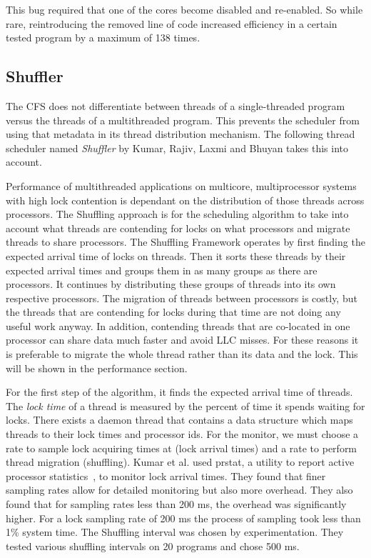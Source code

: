 \documentclass{sig-alternate}
\begin{document}
This bug required that one of the cores become disabled and re-enabled. So while rare, reintroducing the removed line of code increased efficiency in a certain tested program by a maximum of 138 times.~\cite{Lozi:2016}

\subsection{Shuffler}
\label{sec:shuffler}

The CFS does not differentiate between threads of a single-threaded program versus the threads of a multithreaded program. This prevents the scheduler from using that metadata in its thread distribution mechanism. The following thread scheduler named \emph{Shuffler} by Kumar, Rajiv, Laxmi and Bhuyan takes this into account.~\cite{KumarEtal:2014}

Performance of multithreaded applications on multicore, multiprocessor systems with high lock contention is dependant on the distribution of those threads across processors. The Shuffling approach is for the scheduling algorithm to take into account what threads are contending for locks on what processors and migrate threads to share processors. The Shuffling Framework operates by first finding the expected arrival time of locks on threads. Then it sorts these threads by their expected arrival times and groups them in as many groups as there are processors. It continues by distributing these groups of threads into its own respective processors. The migration of threads between processors is costly, but the threads that are contending for locks during that time are not doing any useful work anyway. In addition, contending threads that are co-located in one processor can share data much faster and avoid LLC misses. For these reasons it is preferable to migrate the whole thread rather than its data and the lock. This will be shown in the performance section.~\cite{KumarEtal:2014}

For the first step of the algorithm, it finds the expected arrival time of threads. The \textit{lock time} of a thread is measured by the percent of time it spends waiting for locks. There exists a daemon thread that contains a data structure which maps threads to their lock times and processor ids. For the monitor, we must choose a rate to sample lock acquiring times at (lock arrival times) and a rate to perform thread migration (shuffling). Kumar et al. used prstat, a utility to report active processor statistics~\cite{prstat}, to monitor lock arrival times. They found that finer sampling rates allow for detailed monitoring but also more overhead. They also found that for sampling rates less than 200 ms, the overhead was significantly higher. For a lock sampling rate of 200 ms the process of sampling took less than 1\% system time. The Shuffling interval was chosen by experimentation. They tested various shuffling intervals on 20 programs and chose 500 ms.
\end{document}
